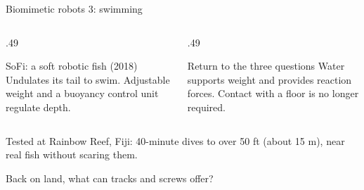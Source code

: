 \documentclass[aspectratio=169]{beamer}
\begin{document}
\begin{frame}[t]{Biomimetic robots 3: swimming}
\footnotesize
\vspace{-2mm}

\centering{}
\par\vspace{-3mm}
\begin{columns}[T,onlytextwidth]\begin{column}{.49\textwidth}
\begin{block}{SoFi: a soft robotic fish (2018)}
Undulates its tail to swim. Adjustable weight and a buoyancy control unit regulate depth.
\end{block}\end{column}\begin{column}{.49\textwidth}\begin{block}{Return to the three questions}
Water supports weight and provides reaction forces. Contact with a floor is no longer required.
\end{block}\end{column}\end{columns}

\footnotesize Tested at Rainbow Reef, Fiji: 40-minute dives to over 50 ft (about 15 m), near real fish without scaring them.

\par\vspace{2mm}\footnotesize Back on land, what can tracks and screws offer?
\end{frame}
\end{document}
